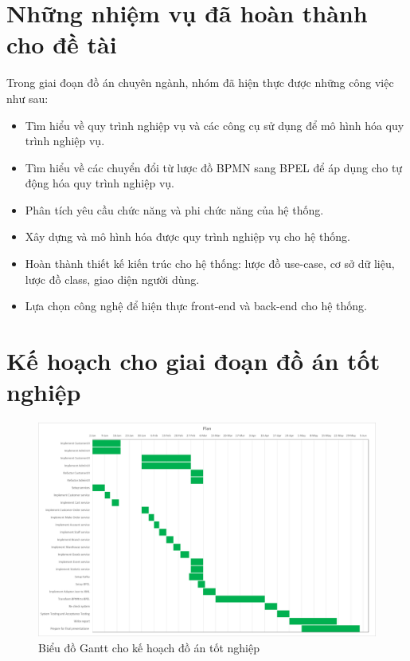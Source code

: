 \section{Những nhiệm vụ đã hoàn thành cho đề tài}
Trong giai đoạn đồ án chuyên ngành, nhóm đã hiện thực được những công việc như sau:
\begin{itemize}
    \item Tìm hiểu về quy trình nghiệp vụ và các công cụ sử dụng để mô hình hóa quy trình nghiệp vụ.
    \item Tìm hiểu về các chuyển đổi từ lược đồ BPMN sang BPEL để áp dụng cho tự động hóa quy trình nghiệp vụ.
    \item Phân tích yêu cầu chức năng và phi chức năng của hệ thống.
    \item Xây dựng và mô hình hóa được quy trình nghiệp vụ cho hệ thống.
    \item Hoàn thành thiết kế kiến trúc cho hệ thống: lược đồ use-case, cơ sở dữ liệu, lược đồ class, giao diện người dùng.
    \item  Lựa chọn công nghệ để hiện thực front-end và back-end cho hệ thống.
\end{itemize}
 
 
\section{Kế hoạch cho giai đoạn đồ án tốt nghiệp}
 
\begin{figure}[h]
    \begin{center}
        \includegraphics[width=14cm]{img/plan.png}
    \end{center}
    \caption{Biểu đồ Gantt cho kế hoạch đồ án tốt nghiệp}
\end{figure}
 
